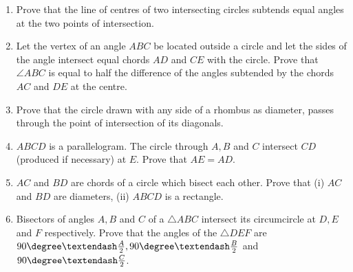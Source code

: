 \begin{enumerate}[label=\thesubsection.\arabic*,ref=\thesubsection.\theenumi]
\item Prove that the line of centres of two intersecting circles subtends equal angles at the
two points of intersection.
\item Let the vertex of an angle $ABC$ be located outside a circle and let the sides of the angle
intersect equal chords $AD$ and $CE$ with the circle. Prove that $\angle ABC$ is equal to half the
difference of the angles subtended by the chords $AC$ and $DE$ at the centre.
\item Prove that the circle drawn with any side of a rhombus as diameter, passes through
the point of intersection of its diagonals.
\item $ABCD$ is a parallelogram. The circle through $A, B$ and $C$ intersect $CD$ (produced if
necessary) at $E$. Prove that $AE = AD$.
\item $AC$ and $BD$ are chords of a circle which bisect each other. Prove that (i) $AC$ and $BD$ are
diameters, (ii) $ABCD$ is a rectangle.
\item Bisectors of angles $A, B$ and $C$ of a $\triangle ABC$ intersect its circumcircle at $D, E$ and
$F$ respectively. Prove that the angles of the $\triangle DEF$ are $90\degree – \frac{A}{2}, 90\degree – \frac{B}{2}$ and $90\degree – \frac{C}{2}$.

\end{enumerate}
